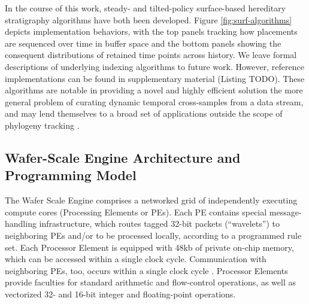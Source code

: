 

In the course of this work, steady- and tilted-policy surface-based hereditary stratigraphy algorithms have both been developed.
Figure \ref{fig:surf-algorithms} depicts implementation behaviors, with the top panels tracking how placements are sequenced over time in buffer space and the bottom panels showing the consequent distributions of retained time points across history.
We leave formal descriptions of underlying indexing algorithms to future work.
However, reference implementations can be found in supplementary material (Listing TODO).
These algorithms are notable in providing a novel and highly efficient solution the more general problem of curating dynamic temporal cross-samples from a data stream, and may lend themselves to a broad set of applications outside the scope of phylogeny tracking \citep{TODOCITEPREPRINT}.




\subsection{Wafer-Scale Engine Architecture and Programming Model}

The Wafer Scale Engine comprises a networked grid of independently executing compute cores (Processing Elements or PEs).
Each PE contains special message-handling infrastructure, which routes tagged 32-bit packets (``wavelets'') to neighboring PEs and/or to be processed locally, according to a programmed rule set.
Each Processor Element is equipped with 48kb of private on-chip memory, which can be accessed within a single clock cycle.
Communication with neighboring PEs, too, occurs within a single clock cycle \citep{TODO}.
Processor Elements provide faculties for standard arithmetic and flow-control operations, as well as vectorized 32- and 16-bit integer and floating-point operations.

